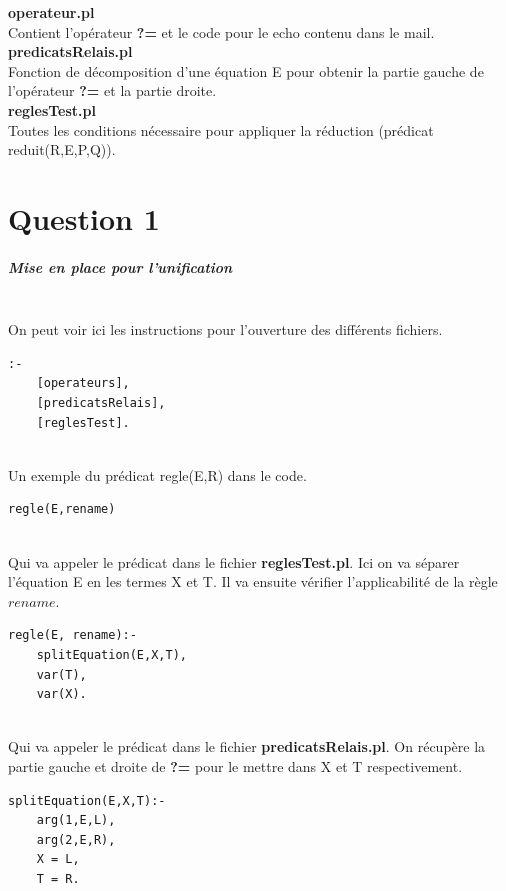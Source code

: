 \documentclass[10pt,a4paper]{report}
\begin{document}
\begin{center}
\textbf{operateur.pl}\\
Contient l'opérateur \textbf{?=} et le code pour le echo contenu dans le mail.\\[1cm]
\textbf{predicatsRelais.pl}\\
Fonction de décomposition d'une équation E pour obtenir la partie gauche de
l'opérateur \textbf{?=} et la partie droite.\\[1cm]
\textbf{reglesTest.pl}\\
Toutes les conditions nécessaire pour appliquer la réduction (prédicat reduit(R,E,P,Q)).\\[1cm]
\end{center}





\chapter*{Question 1}
\paragraph{Mise en place pour l'unification} ~\\
On peut voir ici les instructions pour l'ouverture des différents fichiers.
\begin{lstlisting}[caption ={Dans le fichier $main.pl$}]
:-
	[operateurs],
	[predicatsRelais],
	[reglesTest].
\end{lstlisting} ~\\
Un exemple du prédicat regle(E,R) dans le code.
\begin{lstlisting}[caption ={Dans le fichier $main.pl$}]
regle(E,rename)
\end{lstlisting} ~\\
Qui va appeler le prédicat dans le fichier \textbf{reglesTest.pl}. Ici on va séparer l'équation E en les termes X et T. Il va ensuite vérifier l'applicabilité de la règle $rename$.
\begin{lstlisting}[caption ={Dans le fichier $reglesTest.pl$}]
regle(E, rename):-
	splitEquation(E,X,T),
	var(T),
	var(X).
\end{lstlisting} ~\\
Qui va appeler le prédicat dans le fichier \textbf{predicatsRelais.pl}. On récupère la partie gauche et droite de \textbf{?=} pour le mettre dans X et T respectivement.
\begin{lstlisting}[caption ={Dans le fichier $predicatsRelais.pl$}]
splitEquation(E,X,T):-
	arg(1,E,L),
	arg(2,E,R),
	X = L,
	T = R.
\end{lstlisting}
\end{document}
